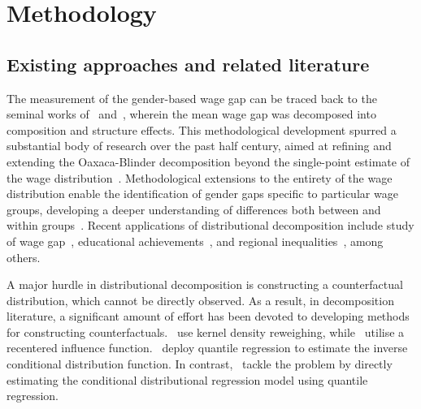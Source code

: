 \section{Methodology} \label{isect2}
\subsection{Existing approaches and related literature}

The measurement of the gender-based wage gap can be traced back to the seminal works of~\citet{Oaxaca1973} and~\citet{Blinder1973}, wherein the mean wage gap was decomposed into composition and structure effects. This methodological development spurred a substantial body of research over the past half century, aimed at refining and extending the Oaxaca-Blinder decomposition beyond the single-point estimate of the wage distribution~\citep{Fortin2011}. Methodological extensions to the entirety of the wage distribution enable the identification of gender gaps specific to particular wage groups, developing a deeper understanding of differences both between and within groups~\citep{Machado2005}. Recent applications of distributional decomposition include study of wage gap~\citep{Maasoumi2019}, educational achievements~\citep{Le2018},  and regional inequalities~\citep{Jemmali2023}, among others.\par

A major hurdle in distributional decomposition is constructing a counterfactual distribution, which cannot be directly observed. As a result, in decomposition literature, a significant amount of effort has been devoted to developing methods for constructing counterfactuals.~\citet{DiNardo1996} use kernel density reweighing, while~\citet{Firpo2009} utilise a recentered influence function.~\citet{Machado2005} deploy quantile regression to estimate the inverse conditional distribution function. In contrast,~\citet{Chernozhukov2013} tackle the problem by directly estimating the conditional distributional regression model using quantile regression.\par

